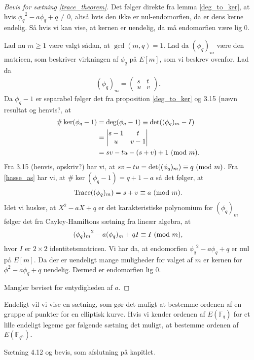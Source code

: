 \begin{proof}[Bevis for sætning \ref{trace_theorem}]
Det følger direkte fra lemma \ref{deg_to_ker}, at hvis ${\phi_q}^2 -a \phi_q + q \neq 0$, altså hvis den ikke er nul-endomorfien, da er dens kerne endelig. Så hvis vi kan vise, at kernen er uendelig, da må endomorfien være lig $0$.

Lad nu $m \geq 1$ være valgt sådan, at $\gcd(m, q) = 1$. Lad da $(\phi_q)_m$ være den matricen, som beskriver virkningen af $\phi_q$ på $E[m]$, som vi beskrev ovenfor. Lad da
\begin{align*}
	(\phi_q)_m = \left( 
	\begin{matrix}
		s & t \\
		u & v
	\end{matrix} \right).
\end{align*}
Da $\phi_q - 1$ er separabel følger det fra proposition \ref{deg_to_ker} og 3.15 (nævn resultat og henvis?, at
\begin{align*}
	\# \ker (\phi_q - 1) &= \deg(\phi_q - 1) \equiv \det((\phi_q)_m - I) \\ 
	&= 
	\left| \begin{matrix}
		s-1 & t \\
		u & v - 1 
	\end{matrix} \right| \\
	&= sv - tu - (s + v) + 1 \ (\mathrm{mod} \ m).
\end{align*}
Fra 3.15 (henvis, opskriv?) har vi, at $sv-tu = \det((\phi_q)_m) \equiv q \ (\mathrm{mod} \ m)$. Fra \eqref{hasse_as} har vi, at 
$\# \ker(\phi_q - 1) = q + 1 - a$ så det følger, at 
\begin{align*}
	\text{Trace}((\phi_q)_m) = s + v \equiv a \ (\mathrm{mod} \ m).
\end{align*}
Idet vi husker, at $X^2 - aX + q$ er det karakteristiske polynomium for $(\phi_q)_m$ følger det fra
Cayley-Hamiltons sætning fra lineær algebra, at
\begin{align*}
	{(\phi_q)_m}^2 - a(\phi_q)_m + qI \equiv I \ (\mathrm{mod} \ m),
\end{align*}
hvor $I$ er $2 \times 2$ identitetsmatricen. Vi har da, at endomorfien ${\phi_q}^2 -a\phi_q + q$ er nul på $E[m]$. Da der er uendeligt mange muligheder for valget af $m$ er kernen for ${\phi}^2 - a\phi_q + q$ uendelig. Dermed er endomorfien lig $0$.

Mangler beviset for entydigheden af $a$.
\end{proof}

Endeligt vil vi vise en sætning, som gør det muligt at bestemme ordenen af en gruppe af punkter for en elliptisk kurve. Hvis vi kender ordenen af $E(\mathbb{F}_q)$ for et lille endeligt legeme gør følgende sætning det muligt, at bestemme ordenen af $E(\mathbb{F}_{q^n})$.

Sætning 4.12 og bevis, som afslutning på kapitlet.





